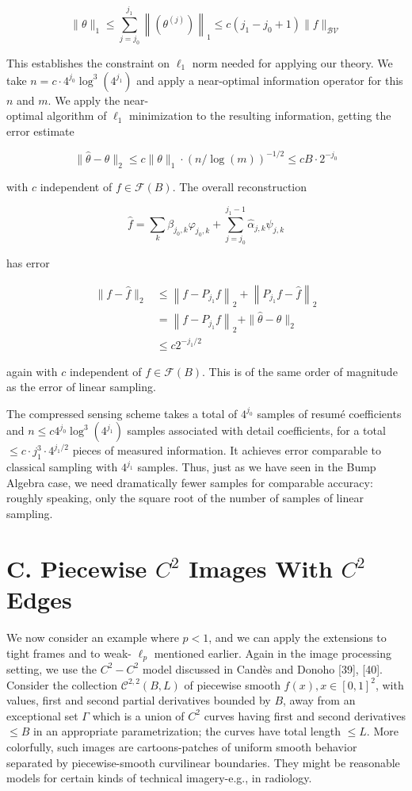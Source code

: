 \documentclass[10pt]{article}
\begin{document}
$$
\|\theta\|_{1} \leq \sum_{j=j_{0}}^{j_{1}}\left\|\left(\theta^{(j)}\right)\right\|_{1} \leq c\left(j_{1}-j_{0}+1\right)\|f\|_{\mathcal{B} \mathcal{V}}
$$

This establishes the constraint on $\ell_{1}$ norm needed for applying our theory. We take $n=c \cdot 4^{j_{0}} \log ^{3}\left(4^{j_{1}}\right)$ and apply a near-optimal information operator for this $n$ and $m$. We apply the near-\\
optimal algorithm of $\ell_{1}$ minimization to the resulting information, getting the error estimate

$$
\|\hat{\theta}-\theta\|_{2} \leq c\|\theta\|_{1} \cdot(n / \log (m))^{-1 / 2} \leq c B \cdot 2^{-j_{0}}
$$

with $c$ independent of $f \in \mathcal{F}(B)$. The overall reconstruction

$$
\hat{f}=\sum_{k} \beta_{j_{0}, k} \varphi_{j_{0}, k}+\sum_{j=j_{0}}^{j_{1}-1} \hat{\alpha}_{j, k} \psi_{j, k}
$$

has error

$$
\begin{aligned}
\|f-\hat{f}\|_{2} & \leq\left\|f-P_{j_{1}} f\right\|_{2}+\left\|P_{j_{1}} f-\hat{f}\right\|_{2} \\
& =\left\|f-P_{j_{1}} f\right\|_{2}+\|\hat{\theta}-\theta\|_{2} \\
& \leq c 2^{-j_{1} / 2}
\end{aligned}
$$

again with $c$ independent of $f \in \mathcal{F}(B)$. This is of the same order of magnitude as the error of linear sampling.

The compressed sensing scheme takes a total of $4^{j_{0}}$ samples of resumé coefficients and $n \leq c 4^{j_{0}} \log ^{3}\left(4^{j_{1}}\right)$ samples associated with detail coefficients, for a total $\leq c \cdot j_{1}^{3} \cdot 4^{j_{1} / 2}$ pieces of measured information. It achieves error comparable to classical sampling with $4^{j_{1}}$ samples. Thus, just as we have seen in the Bump Algebra case, we need dramatically fewer samples for comparable accuracy: roughly speaking, only the square root of the number of samples of linear sampling.

\section*{C. Piecewise $C^{2}$ Images With $C^{2}$ Edges}
We now consider an example where $p<1$, and we can apply the extensions to tight frames and to weak- $\ell_{p}$ mentioned earlier. Again in the image processing setting, we use the $C^{2}-C^{2}$ model discussed in Candès and Donoho [39], [40]. Consider the collection $\mathcal{C}^{2,2}(B, L)$ of piecewise smooth $f(x), x \in[0,1]^{2}$, with values, first and second partial derivatives bounded by $B$, away from an exceptional set $\Gamma$ which is a union of $C^{2}$ curves having first and second derivatives $\leq B$ in an appropriate parametrization; the curves have total length $\leq L$. More colorfully, such images are cartoons-patches of uniform smooth behavior separated by piecewise-smooth curvilinear boundaries. They might be reasonable models for certain kinds of technical imagery-e.g., in radiology.
\end{document}
